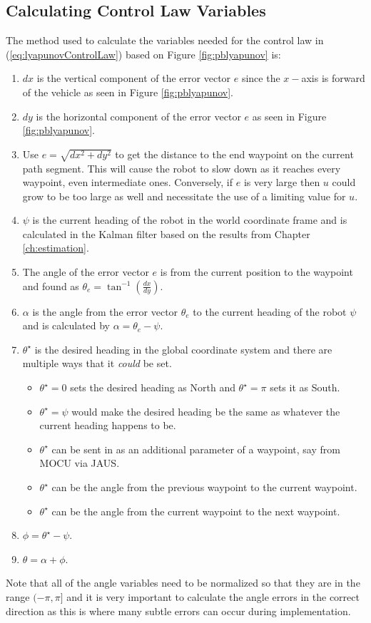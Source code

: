 \subsection{Calculating Control Law Variables}
\label{sec:lyapunovVariables}
The method used to calculate the variables needed for the control law in (\ref{eq:lyapunovControlLaw}) based on Figure \ref{fig:pblyapunov} is:
\begin{enumerate}
\item $dx$ is the vertical component of the error vector $e$ since the $x-$axis is forward of the vehicle as seen in Figure \ref{fig:pblyapunov}.
\item $dy$ is the horizontal component of the error vector $e$ as seen in Figure \ref{fig:pblyapunov}.
\item Use $e = \sqrt{dx^2 + dy^2}$ to get the distance to the end waypoint on the current path segment. This will cause the robot to slow down as it reaches every waypoint, even intermediate ones. Conversely, if $e$ is very large then $u$ could grow to be too large as well and necessitate the use of a limiting value for $u$.
\item $\psi$ is the current heading of the robot in the world coordinate frame and is calculated in the Kalman filter based on the results from Chapter \ref{ch:estimation}.
\item The angle of the error vector $e$ is from the current position to the waypoint and found as $\theta_e = \tan^{-1}\left(\frac{dx}{dy}\right)$.
\item $\alpha$ is the angle from the error vector $\theta_e$ to the current heading of the robot $\psi$ and is calculated by $\alpha = \theta_e - \psi$.
\item $\theta^\star$ is the desired heading in the global coordinate system and there are multiple ways that it \textit{could} be set.
\begin{itemize}
\item $\theta^\star=0$ sets the desired heading as North and $\theta^\star=\pi$ sets it as South.
\item $\theta^\star=\psi$ would make the desired heading be the same as whatever the current heading happens to be.
\item $\theta^\star$ can be sent in as an additional parameter of a waypoint, say from MOCU via JAUS.
\item $\theta^\star$ can be the angle from the previous waypoint to the current waypoint.
\item $\theta^\star$ can be the angle from the current waypoint to the next waypoint.
\end{itemize}
\item $\phi=\theta^\star-\psi$.
\item $\theta=\alpha + \phi$.
\end{enumerate}
Note that all of the angle variables need to be normalized so that they are in the range $(-\pi,\pi]$ and it is very important to calculate the angle errors in the correct direction as this is where many subtle errors can occur during implementation.

